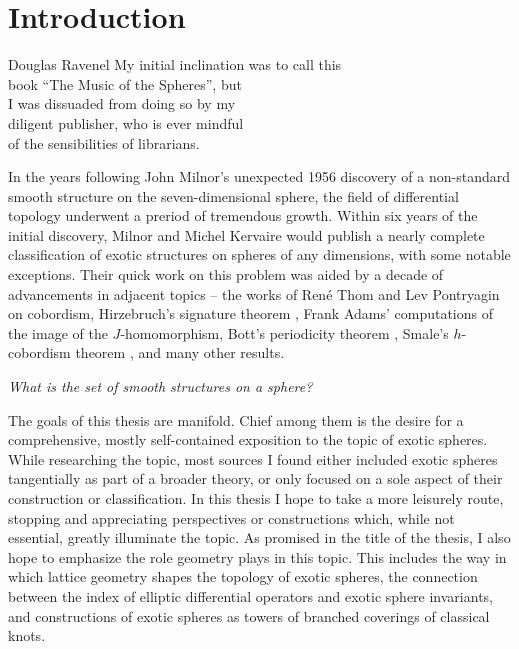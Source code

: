 \chapter{Introduction}\label{chap:introduction}

\begin{epigraph}{17em}{Douglas Ravenel}
  My initial inclination was to call this\\
  book ``The Music of the Spheres'', but\\
  I was dissuaded from doing so by my \\
  diligent publisher, who is ever mindful \\
  of the sensibilities of librarians.
\end{epigraph}

In the years following John Milnor's unexpected 1956 discovery \cite{milnor1956manifolds} of a non-standard smooth structure on the seven-dimensional sphere, the field of differential topology underwent a preriod of tremendous growth. Within six years of the initial discovery, Milnor and Michel Kervaire would publish a nearly complete classification of exotic structures on spheres of any dimensions, with some notable exceptions. 
Their quick work on this problem was aided by a decade of advancements in adjacent topics -- the works of Ren\'e Thom \cite{thom1954} and Lev Pontryagin \cite{pontryagin1959homotopy} on cobordism, Hirzebruch's signature theorem \cite{hirzebruch1966methods}, Frank Adams' computations of the image of the $J$-homomorphism, Bott's periodicity theorem \cite{bott1959stable}, Smale's $h$-cobordism theorem \cite{smale1961generalized}, and many other results. 


\begin{center}
  \textsl{What is the set of smooth structures on a sphere?}
\end{center}

The goals of this thesis are manifold. Chief among them is the desire for a comprehensive, mostly self-contained exposition to the topic of exotic spheres. While researching the topic, most sources I found either included exotic spheres tangentially as part of a broader theory, or only focused on a sole aspect of their construction or classification.
In this thesis I hope to take a more leisurely route, stopping and appreciating perspectives or constructions which, while not essential, greatly illuminate the topic.
As promised in the title of the thesis, I also hope to emphasize the role geometry plays in this topic.
This includes the way in which lattice geometry shapes the topology of exotic spheres, the connection between the index of elliptic differential operators and exotic sphere invariants, and constructions of exotic spheres as towers of branched coverings of classical knots. 

